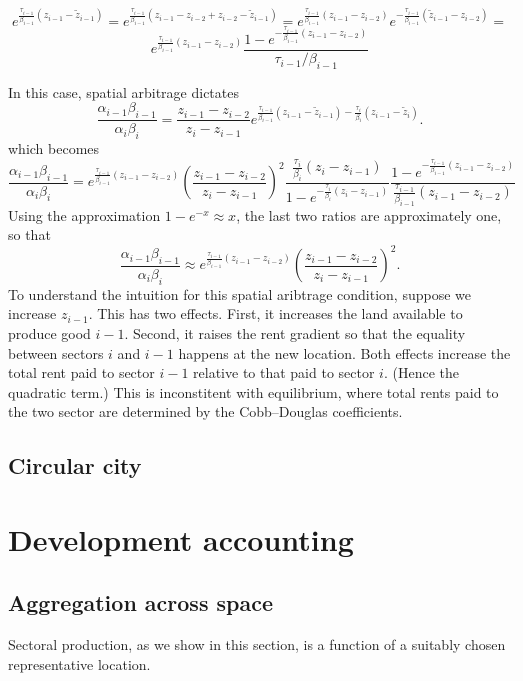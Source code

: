 \documentclass[12pt]{article}
\begin{document}
\[
e^{\frac{\tau_{i-1}}{\beta_{i-1}}(z_{i-1}-\tilde z_{i-1})} =
e^{\frac{\tau_{i-1}}{\beta_{i-1}}(z_{i-1}-z_{i-2}+z_{i-2}-\tilde z_{i-1})} =
e^{\frac{\tau_{i-1}}{\beta_{i-1}}(z_{i-1}-z_{i-2})}
e^{-\frac{\tau_{i-1}}{\beta_{i-1}}(\tilde z_{i-1}-z_{i-2})} =
\]
\[
e^{\frac{\tau_{i-1}}{\beta_{i-1}}(z_{i-1}-z_{i-2})}
\frac
{1-e^{-\frac{\tau_{i-1}}{\beta_{i-1}} (z_{i-1} - z_{i-2}) }}
{\tau_{i-1}/\beta_{i-1}}
\]

In this case, spatial arbitrage dictates
\[
\frac{\alpha_{i-1}\beta_{i-1} }
{\alpha_i \beta_i}
=
\frac{z_{i-1}-z_{i-2}}
{z_i - z_{i-1}}
  e^{\frac{\tau_{i-1}}{\beta_{i-1}}(z_{i-1}-\tilde z_{i-1})-\frac{\tau_i}{\beta_i}(z_{i-1} -\tilde z_i)}.
\]
which becomes
\[
\frac{\alpha_{i-1}\beta_{i-1} }
{\alpha_i \beta_i}
=
e^{\frac{\tau_{i-1}}{\beta_{i-1}}(z_{i-1}-z_{i-2})}
\left(\frac{z_{i-1}-z_{i-2}}
{z_i - z_{i-1}}\right)^2
\frac
{\frac{\tau_i}{\beta_i}(z_{i} - z_{i-1})}
{1-e^{-\frac{\tau_i}{\beta_i} (z_{i} - z_{i-1}) }}
\frac
{1-e^{-\frac{\tau_{i-1}}{\beta_{i-1}} (z_{i-1} - z_{i-2}) }}
{\frac{\tau_{i-1}}{\beta_{i-1}} (z_{i-1} - z_{i-2})}
\]
Using the approximation $1-e^{-x}\approx x$, the last two ratios are approximately one, so that
\[
\frac{\alpha_{i-1}\beta_{i-1} }
{\alpha_i \beta_i}
\approx
e^{\frac{\tau_{i-1}}{\beta_{i-1}}(z_{i-1}-z_{i-2})}
\left(\frac{z_{i-1}-z_{i-2}}
{z_i - z_{i-1}}\right)^2.
\]
To understand the intuition for this spatial aribtrage condition, suppose we increase $z_{i-1}$. This has two effects. First, it increases the land available to produce good $i-1$. Second, it raises the rent gradient so that the equality between sectors $i$ and $i-1$ happens at the new location. Both effects increase the total rent paid to sector $i-1$ relative to that paid to sector $i$. (Hence the quadratic term.) This is inconstitent with equilibrium, where total rents paid to the two sector are determined by the Cobb--Douglas coefficients.

\subsection{Circular city}




\section{Development accounting}
\subsection{Aggregation across space}
Sectoral production, as we show in this section, is a function of a suitably chosen representative location. 
\end{document}
